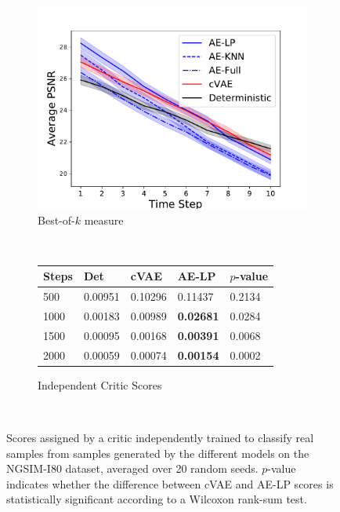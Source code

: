 \documentclass{article}
\begin{document}
\begin{figure}
  \centering
  \begin{subfigure}[b]{0.4\textwidth}
    \includegraphics[width=\textwidth]{images/best_of_k_i80.pdf}
    \caption{Best-of-$k$ measure}
    \label{fig:gull}
  \end{subfigure}
  ~ %
  \begin{subfigure}[b]{0.25\textwidth}
  \centering
  \begin{tabular}{l|l|lll}
    \toprule
    Steps     & Det & cVAE & AE-LP & $p$-value \\
    \midrule
    500 & 0.00951 & 0.10296 & 0.11437 & 0.2134 \\
    1000 & 0.00183 & 0.00989 & \textbf{0.02681} & 0.0284 \\
    1500 & 0.00095 & 0.00168 & \textbf{0.00391} & 0.0068 \\
    2000 & 0.00059 & 0.00074 & \textbf{0.00154} & 0.0002 \\
    \bottomrule
  \end{tabular}
      \caption{Independent Critic Scores}
    \label{fig:tiger}
  \end{subfigure}
  ~ %
      \caption{Scores assigned by a critic independently trained to classify real samples from samples generated by the different models on the NGSIM-I80 dataset, averaged over 20 random seeds. $p$-value indicates whether the difference between cVAE and AE-LP scores is statistically significant according to a Wilcoxon rank-sum test.}

  \end{figure}
\end{document}
